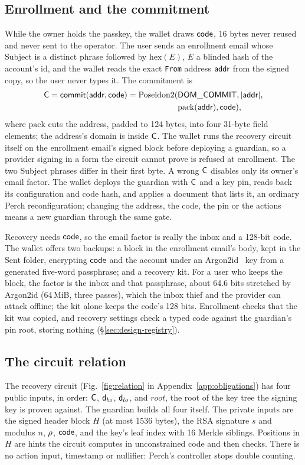 \subsection{Enrollment and the commitment}\label{sec:design-enroll}
While the owner holds the passkey, the wallet draws $\mathsf{code}$, 16 bytes never
reused and never sent to the operator. The user sends an enrollment email
whose Subject is a distinct phrase followed by $\mathrm{hex}(E)$, $E$ a
blinded hash of the account's id, and the wallet reads the exact
\texttt{From} address $\mathsf{addr}$ from the signed copy, so the user never types
it. The commitment is
\begin{align*}
  \mathsf{C} = \mathsf{commit}(\mathsf{addr}, \mathsf{code}) = \mathrm{Poseidon2}(&\mathsf{DOM\_COMMIT}, |\mathsf{addr}|,\\
    &\mathrm{pack}(\mathsf{addr}), \mathsf{code}),
\end{align*}
where $\mathrm{pack}$ cuts the address, padded to 124 bytes, into four
31-byte field elements; the address's domain is inside $\mathsf{C}$. The wallet
runs the recovery circuit itself on the enrollment email's signed block
before deploying a guardian, so a provider signing in a form the circuit
cannot prove is refused at enrollment. The two Subject
phrases differ in their first byte. A
wrong $\mathsf{C}$ disables only its owner's email factor. The wallet deploys the
guardian with $\mathsf{C}$ and a key pin, reads back its configuration and code
hash, and applies a document that lists it, an ordinary Perch
reconfiguration; changing the address, the code, the pin or the actions
means a new guardian through the same gate.

Recovery needs $\mathsf{code}$, so the email factor is really the inbox and a
128-bit code. The wallet offers two backups: a block in the enrollment
email's body, kept in the Sent folder, encrypting $\mathsf{code}$ and the account
under an Argon2id~\cite{rfc9106} key from a generated five-word passphrase;
and a recovery kit. For a user who keeps the
block, the factor is the inbox and that passphrase, about 64.6 bits
stretched by Argon2id (64\,MiB, three passes), which the inbox thief and the
provider can attack offline; the kit alone keeps the code's 128
bits. Enrollment checks that the
kit was copied, and recovery settings check a typed code against the
guardian's pin root, storing nothing (\S\ref{sec:design-registry}).

\subsection{The circuit relation}\label{sec:design-circuit}
The recovery circuit (Fig.~\ref{fig:relation} in Appendix~\ref{app:obligations}) has four public inputs, in
order: $\mathsf{C}$, $\mathsf{d}_{hi}$, $\mathsf{d}_{lo}$, and $\mathit{root}$, the root of
the key tree the signing key is proven against. The guardian builds all four
itself. The private inputs are the signed header block $H$ (at most 1536
bytes), the RSA signature $s$ and modulus $n$, $\rho$, $\mathsf{code}$, and the
key's leaf index with 16 Merkle siblings. Positions in $H$ are hints the
circuit computes in unconstrained code and then checks. There is no action
input, timestamp or nullifier: Perch's controller stops double counting.

